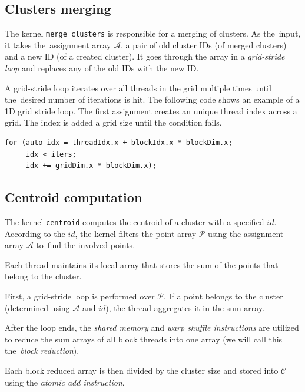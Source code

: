 \subsection{Clusters merging}


The kernel \texttt{merge\_clusters} is responsible for a merging of clusters. As the~input, it takes the~assignment array $\mathcal{A}$, a pair of old cluster IDs (of merged clusters) and a new ID (of a created cluster). It goes through the array in a \emph{grid-stride loop} and replaces any of the old IDs with the new ID.

\begin{defn}
	A grid-stride loop iterates over all threads in the grid multiple times until the~desired number of iterations is hit. The following code shows an example of a 1D grid stride loop. The first assignment creates an unique thread index across a grid. The index is added a grid size until the condition fails.
	\label{def03:grid-stride}
\end{defn}

\begin{lstlisting}
for (auto idx = threadIdx.x + blockIdx.x * blockDim.x; 
     idx < iters; 
     idx += gridDim.x * blockDim.x);
\end{lstlisting}

\subsection{Centroid computation}

The kernel \texttt{centroid} computes the centroid of a cluster with a specified $id$. According to the $id$, the kernel filters the point array $\mathcal{P}$ using the assignment array $\mathcal{A}$ to~find the involved points.

Each thread maintains its local array that stores the sum of the points that belong to the cluster. 

First, a grid-stride loop is performed over $\mathcal{P}$. If a point belongs to the cluster (determined using $\mathcal{A}$ and $id$), the thread aggregates it in the sum array. 

After the loop ends, the \emph{shared memory} and \emph{warp shuffle instructions} are utilized to reduce the sum arrays of all block threads into one array (we will call this the~\emph{block reduction}).

Each block reduced array is then divided by the cluster size and stored into $\mathcal{C}$ using the \emph{atomic add instruction}. 

